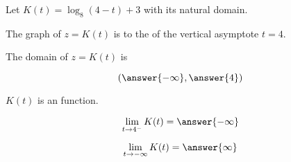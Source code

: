 \documentclass{ximera}
\author{Lee Wayand}
\begin{document}
\begin{exercise}






Let $K(t) = \log_8(4-t) + 3$ with its natural domain. \\





\begin{question}


The graph of $z = K(t)$ is to the  of the vertical asymptote $t = 4$.


\end{question}





\begin{question}


The domain of $z = K(t)$ is 

\[
\left( \answer{-\infty}, \answer{4} \right)
\]


\end{question}






\begin{question}


$K(t)$ is an  function.


\end{question}











\begin{question}


\[
\lim\limits_{t \to 4^-} K(t) = \answer{-\infty}
\]


\end{question}








\begin{question}


\[
\lim\limits_{t \to -\infty} K(t) = \answer{\infty}
\]


\end{question}










\end{exercise}
\end{document}
